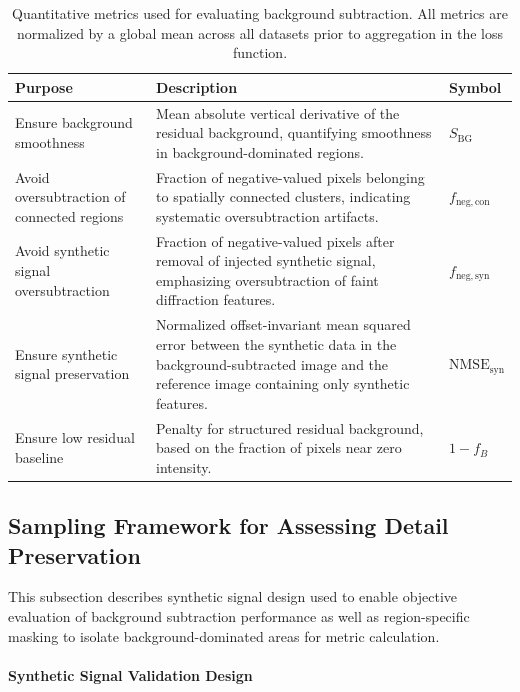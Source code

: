 \documentclass[iucr]{iucrjournals}
\begin{document}
\begin{table}[t]
\caption{Quantitative metrics used for evaluating background subtraction. 
All metrics are normalized by a global mean across all datasets prior to aggregation in the loss function.}
\label{tab:loss_terms}
\centering
\small
\setlength{\tabcolsep}{6pt}
\renewcommand{\arraystretch}{1.1}
\begin{tabular}{@{}p{3.5cm}p{9.0cm}p{1.5cm}@{}}
\toprule
\textbf{Purpose} & \textbf{Description} & \textbf{Symbol} \\
\midrule
Ensure background smoothness  & Mean absolute vertical derivative of the residual background, quantifying smoothness in background-dominated regions. & $S_{\mathrm{BG}}$ \\
Avoid oversubtraction of connected regions & Fraction of negative-valued pixels belonging to spatially connected clusters, indicating systematic oversubtraction artifacts. & $f_{\mathrm{neg,con}}$ \\
Avoid synthetic signal oversubtraction & Fraction of negative-valued pixels after removal of injected synthetic signal, emphasizing oversubtraction of faint diffraction features. & $f_{\mathrm{neg,syn}}$ \\
Ensure synthetic signal preservation & Normalized offset-invariant mean squared error between the synthetic data in the background-subtracted image and the reference image containing only synthetic features.& $\mathrm{NMSE}_{\mathrm{syn}}$  \\
Ensure low residual baseline & Penalty for structured residual background, based on the fraction of pixels near zero intensity. & $1 - f_{B}$ \\
\bottomrule
\end{tabular}
\end{table}




\subsection{Sampling Framework for Assessing Detail Preservation}
\label{sec:sampling_framework}

This subsection describes synthetic signal design used to enable objective evaluation of background subtraction performance as well as region-specific masking to isolate background-dominated areas for metric calculation.

\paragraph{Synthetic Signal Validation Design}
\end{document}
